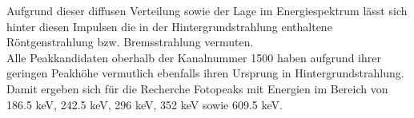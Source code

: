 \documentclass[12pt,german]{article}
\begin{document}
    Aufgrund dieser diffusen Verteilung sowie der Lage im Energiespektrum lässt sich hinter diesen Impulsen die in der Hintergrundstrahlung enthaltene Röntgenstrahlung bzw. Bremsstrahlung vermuten. \\
    Alle Peakkandidaten oberhalb der Kanalnummer 1500 haben aufgrund ihrer geringen Peakhöhe vermutlich ebenfalls ihren Ursprung in Hintergrundstrahlung. \\
    Damit ergeben sich für die Recherche Fotopeaks mit Energien im Bereich von 186.5 keV, 242.5 keV, 296 keV, 352 keV sowie 609.5 keV. \\
    
\end{document}
